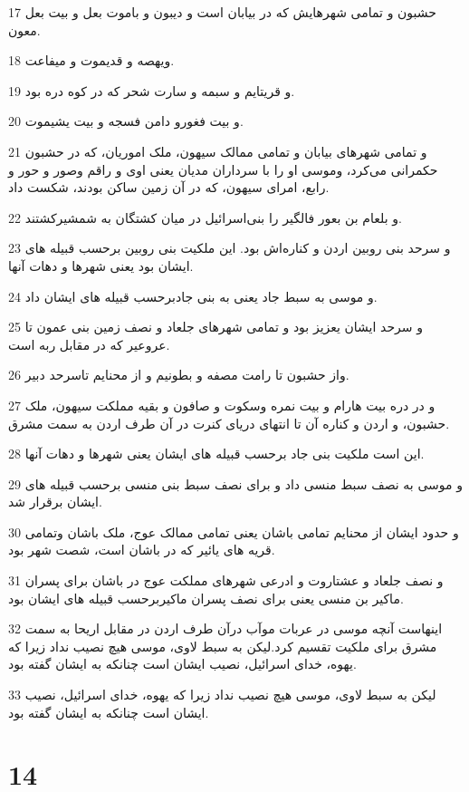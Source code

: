 \par 17 حشبون و تمامی شهرهایش که در بیابان است و دیبون و باموت بعل و بیت بعل معون.
\par 18 ویهصه و قدیموت و میفاعت.
\par 19 و قریتایم و سبمه و سارت شحر که در کوه دره بود.
\par 20 و بیت فغورو دامن فسجه و بیت یشیموت.
\par 21 و تمامی شهرهای بیابان و تمامی ممالک سیهون، ملک اموریان، که در حشبون حکمرانی می‌کرد، وموسی او را با سرداران مدیان یعنی اوی و راقم وصور و حور و رابع، امرای سیهون، که در آن زمین ساکن بودند، شکست داد.
\par 22 و بلعام بن بعور فالگیر را بنی‌اسرائیل در میان کشتگان به شمشیرکشتند.
\par 23 و سرحد بنی روبین اردن و کناره‌اش بود. این ملکیت بنی روبین برحسب قبیله های ایشان بود یعنی شهرها و دهات آنها.
\par 24 و موسی به سبط جاد یعنی به بنی جادبرحسب قبیله های ایشان داد.
\par 25 و سرحد ایشان یعزیز بود و تمامی شهرهای جلعاد و نصف زمین بنی عمون تا عروعیر که در مقابل ربه است.
\par 26 واز حشبون تا رامت مصفه و بطونیم و از محنایم تاسرحد دبیر.
\par 27 و در دره بیت هارام و بیت نمره وسکوت و صافون و بقیه مملکت سیهون، ملک حشبون، و اردن و کناره آن تا انتهای دریای کنرت در آن طرف اردن به سمت مشرق.
\par 28 این است ملکیت بنی جاد برحسب قبیله های ایشان یعنی شهرها و دهات آنها.
\par 29 و موسی به نصف سبط منسی داد و برای نصف سبط بنی منسی برحسب قبیله های ایشان برقرار شد.
\par 30 و حدود ایشان از محنایم تمامی باشان یعنی تمامی ممالک عوج، ملک باشان وتمامی قریه های یائیر که در باشان است، شصت شهر بود.
\par 31 و نصف جلعاد و عشتاروت و ادرعی شهرهای مملکت عوج در باشان برای پسران ماکیر بن منسی یعنی برای نصف پسران ماکیربرحسب قبیله های ایشان بود.
\par 32 اینهاست آنچه موسی در عربات موآب درآن طرف اردن در مقابل اریحا به سمت مشرق برای ملکیت تقسیم کرد.لیکن به سبط لاوی، موسی هیچ نصیب نداد زیرا که یهوه، خدای اسرائیل، نصیب ایشان است چنانکه به ایشان گفته بود.
\par 33 لیکن به سبط لاوی، موسی هیچ نصیب نداد زیرا که یهوه، خدای اسرائیل، نصیب ایشان است چنانکه به ایشان گفته بود.
 
\chapter{14}

